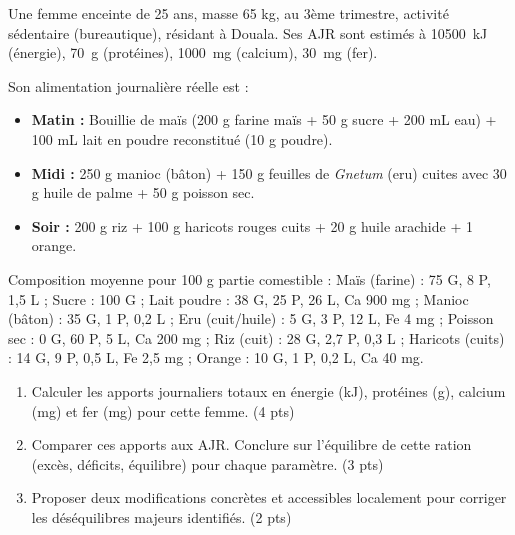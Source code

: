 \documentclass[11pt]{article}
\begin{document}
\begin{exercice}
Une femme enceinte de 25 ans, masse 65 kg, au 3ème trimestre, activité sédentaire (bureautique), résidant à Douala. Ses AJR sont estimés à \SI{10500}{kJ} (énergie), \SI{70}{g} (protéines), \SI{1000}{mg} (calcium), \SI{30}{mg} (fer).

Son alimentation journalière réelle est :
\begin{itemize}
\item \textbf{Matin :} Bouillie de maïs (200 g farine maïs + 50 g sucre + 200 mL eau) + 100 mL lait en poudre reconstitué (10 g poudre).
\item \textbf{Midi :} 250 g manioc (bâton) + 150 g feuilles de \textit{Gnetum} (eru) cuites avec 30 g huile de palme + 50 g poisson sec.
\item \textbf{Soir :} 200 g riz + 100 g haricots rouges cuits + 20 g huile arachide + 1 orange.
\end{itemize}
Composition moyenne pour 100 g partie comestible :
Maïs (farine) : 75 G, 8 P, 1,5 L ; Sucre : 100 G ; Lait poudre : 38 G, 25 P, 26 L, Ca 900 mg ; Manioc (bâton) : 35 G, 1 P, 0,2 L ; Eru (cuit/huile) : 5 G, 3 P, 12 L, Fe 4 mg ; Poisson sec : 0 G, 60 P, 5 L, Ca 200 mg ; Riz (cuit) : 28 G, 2,7 P, 0,3 L ; Haricots (cuits) : 14 G, 9 P, 0,5 L, Fe 2,5 mg ; Orange : 10 G, 1 P, 0,2 L, Ca 40 mg.

\begin{enumerate}
\item Calculer les apports journaliers totaux en énergie (kJ), protéines (g), calcium (mg) et fer (mg) pour cette femme. \hfill (4 pts)
\item Comparer ces apports aux AJR. Conclure sur l'équilibre de cette ration (excès, déficits, équilibre) pour chaque paramètre. \hfill (3 pts)
\item Proposer deux modifications concrètes et accessibles localement pour corriger les déséquilibres majeurs identifiés. \hfill (2 pts)
\end{enumerate}
\end{exercice}
\end{document}
